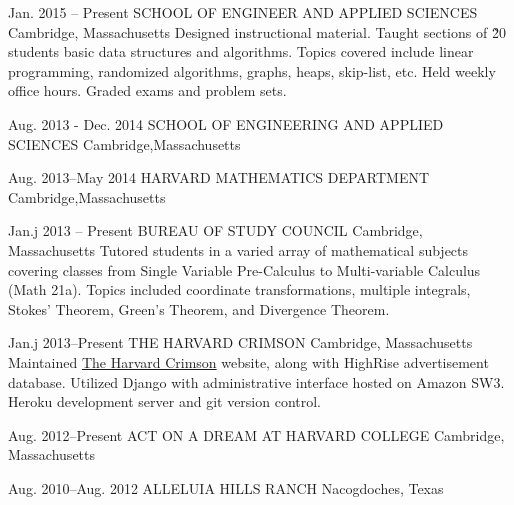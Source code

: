\documentclass[]{friggeri-cv} %
\begin{document}
\entry
{Jan. 2015 -- Present}
{SCHOOL OF ENGINEER AND APPLIED SCIENCES}
{Cambridge, Massachusetts}
{
{Designed instructional material. Taught sections of \~20 students basic data structures and algorithms. Topics covered include linear programming, randomized algorithms, graphs, heaps, skip-list, etc. Held weekly office hours. Graded exams and problem sets.}}

\entry
{Aug. 2013 - Dec. 2014}
{SCHOOL OF ENGINEERING AND APPLIED SCIENCES}
{Cambridge,Massachusetts}
{}

\entry
{Aug. 2013--May 2014}
{HARVARD MATHEMATICS DEPARTMENT}
{Cambridge,Massachusetts}
{}

\begin{detailed}

\entry
{Jan.j 2013 -- Present}
{BUREAU OF STUDY COUNCIL}
{Cambridge, Massachusetts}
{
{Tutored students in a varied array of mathematical subjects covering classes from Single Variable Pre-Calculus to Multi-variable Calculus (Math 21a). Topics included coordinate transformations, multiple integrals, Stokes' Theorem, Green's Theorem, and Divergence Theorem.}}

\entry
{Jan.j 2013--Present}
{THE HARVARD CRIMSON}
{Cambridge, Massachusetts}
{
{Maintained \href{http://thecrimson.com}{The Harvard Crimson} website, along with HighRise advertisement database. Utilized Django with administrative interface hosted on Amazon SW3. Heroku development server and git version control.}}

\entry
{Aug. 2012--Present}
{ACT ON A DREAM AT HARVARD COLLEGE}
{Cambridge, Massachusetts}
{}

\entry
{Aug. 2010--Aug. 2012}
{ALLELUIA HILLS RANCH}
{Nacogdoches, Texas}
{}
\end{detailed}
\end{document}
